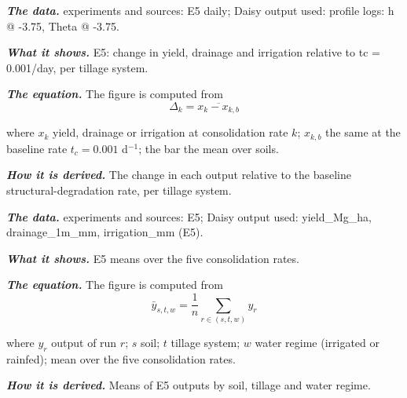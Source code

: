 \par\noindent\textbf{\color{khmag}\emph{The data.}} experiments and sources: E5 daily; Daisy output used: profile logs: h @ -3.75, Theta @ -3.75.
\par\vspace{6pt}\noindent{}\par\nobreak
{}\label{fig:a19_11}
\par\noindent\textbf{\color{khmag}\emph{What it shows.}} E5: change in yield, drainage and irrigation relative to tc = 0.001/day, per tillage system.
\par\noindent\textbf{\color{khmag}\emph{The equation.}} The figure is computed from
\begin{equation}\boxed{\Delta_k=\overline{x_k-x_{k,b}}}\end{equation}
\par\noindent where $x_k$ yield, drainage or irrigation at consolidation rate $k$; $x_{k,b}$ the same at the baseline rate $t_c=0.001$ d$^{-1}$; the bar the mean over soils.
\par\noindent\textbf{\color{khmag}\emph{How it is derived.}} The change in each output relative to the baseline structural-degradation rate, per tillage system.
\par\noindent\textbf{\color{khmag}\emph{The data.}} experiments and sources: E5; Daisy output used: yield\_Mg\_ha, drainage\_1m\_mm, irrigation\_mm (E5).
\par\vspace{6pt}\noindent{}\par\nobreak
{}\label{fig:a19_12}
\par\noindent\textbf{\color{khmag}\emph{What it shows.}} E5 means over the five consolidation rates.
\par\noindent\textbf{\color{khmag}\emph{The equation.}} The figure is computed from
\begin{equation}\boxed{\bar y_{s,t,w}=\dfrac1{n}\sum_{r\in(s,t,w)} y_r}\end{equation}
\par\noindent where $y_r$ output of run $r$; $s$ soil; $t$ tillage system; $w$ water regime (irrigated or rainfed); mean over the five consolidation rates.
\par\noindent\textbf{\color{khmag}\emph{How it is derived.}} Means of E5 outputs by soil, tillage and water regime.
